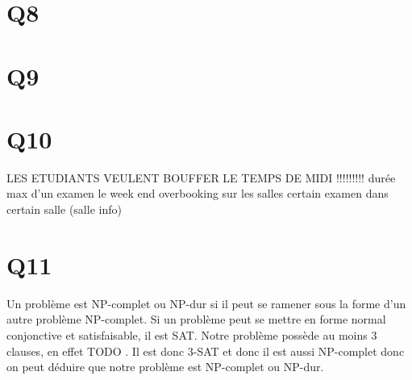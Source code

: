\documentclass[a4paper,11pt]{article}
\begin{document}
\section{Q8}

\section{Q9}

\section{Q10}

LES ETUDIANTS VEULENT BOUFFER LE TEMPS DE MIDI !!!!!!!!!
durée max d'un examen
le week end
overbooking sur les salles
certain examen dans certain salle (salle info)


\section{Q11}
Un problème est NP-complet ou NP-dur si il peut se ramener sous la forme d'un autre problème NP-complet. Si un problème peut se mettre en forme normal conjonctive et satisfaisable, il est SAT. Notre problème possède au moins 3 clauses, en effet TODO . Il est donc 3-SAT et donc il est aussi NP-complet donc on peut déduire que notre problème est NP-complet ou NP-dur.
\end{document}
